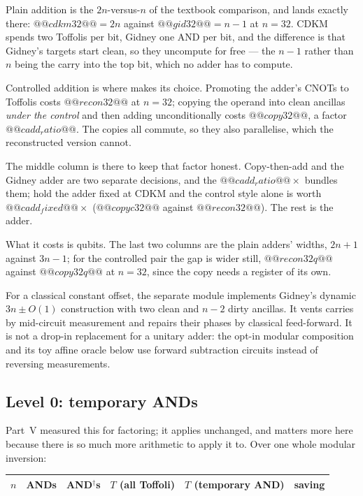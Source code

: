 \noindent
Plain addition is the $2n$-versus-$n$ of the textbook comparison, and lands exactly there:
$@@cdkm32@@=2n$ against $@@gid32@@=n-1$ at $n=32$. CDKM spends two Toffolis per bit, Gidney one AND
per bit, and the difference is that Gidney's targets start clean, so they uncompute for free --- the
$n-1$ rather than $n$ being the carry into the top bit, which no adder has to compute.

Controlled addition is where \cite{ec:kim26} makes its choice. Promoting the adder's CNOTs to
Toffolis costs $@@recon32@@$ at $n=32$; copying the operand into clean ancillas \emph{under the
control} and then adding unconditionally costs $@@copy32@@$, a factor $@@cadd_ratio@@$. The copies
all commute, so they also parallelise, which the reconstructed version cannot.


\noindent
The middle column is there to keep that factor honest. Copy-then-add and the Gidney adder are two
separate decisions, and the $@@cadd_ratio@@\times$ bundles them; hold the adder fixed at CDKM and
the control style alone is worth $@@cadd_fixed@@\times$ ($@@copyc32@@$ against $@@recon32@@$).
The rest is the adder.

What it costs is qubits. The last two columns are the plain adders' widths, $2n+1$ against
$3n-1$; for the controlled pair the gap is wider still, $@@recon32q@@$ against $@@copy32q@@$ at
$n=32$, since the copy needs a register of its own.

\noindent
For a classical constant offset, the separate module
 implements Gidney's dynamic $3n\pm O(1)$ construction with two clean
and $n-2$ dirty ancillas. It vents carries by mid-circuit measurement and repairs their phases by
classical feed-forward. It is not a drop-in replacement for a unitary adder:
the opt-in modular composition and its toy affine oracle below use forward
subtraction circuits instead of reversing measurements.

\subsection{Level 0: temporary ANDs}\label{ec:sec:fastand}

Part~V measured this for factoring; it applies unchanged, and matters more here because there is so
much more arithmetic to apply it to. Over one whole modular inversion:

\begin{center}\small
\begin{tabular}{@{}rrrrrr@{}}
\toprule
$n$ & ANDs & AND$^\dagger$s & $T$ (all Toffoli) & $T$ (temporary AND) & saving\\
\midrule
\bottomrule
\end{tabular}
\end{center}

